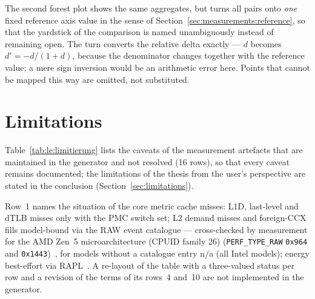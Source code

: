 
The second forest plot shows the same aggregates, but turns all pairs onto \emph{one} fixed
reference axis value in the sense of Section~\ref{sec:measurements:reference}, so that the yardstick
of the comparison is named unambiguously instead of remaining open. The turn converts the relative
delta exactly --- $d$ becomes $d' = -d/(1+d)$, because the denominator changes together with the
reference value; a mere sign inversion would be an arithmetic error here. Points that cannot be
mapped this way are omitted, not substituted.


\section{Limitations}\label{sec:measurements:limitations}

Table~\ref{tab:le:limitierung} lists the caveats of the measurement artefacts that are maintained
in the generator and not resolved (16 rows), so that every caveat remains documented; the
limitations of the thesis from the user's perspective are stated in the conclusion
(Section~\ref{sec:limitations}).



Row~1 names the situation of the core metric cache misses: L1D, last-level and dTLB misses only
with the PMC switch set; L2 demand misses and foreign-CCX fills model-bound via the RAW event
catalogue --- cross-checked by measurement for the AMD Zen~5 microarchitecture (CPUID family 26)
(\texttt{PERF\_TYPE\_RAW}
\texttt{0x964} and \texttt{0x1443})~\cite{linux_perf_amdzen5}, for models without a catalogue entry %
n/a (all Intel models); energy best-effort via RAPL~\cite{david2010rapl}. A re-layout of the table
with a three-valued status per row and a revision of the terms of its rows~4 and~10 are not
implemented in the generator.
